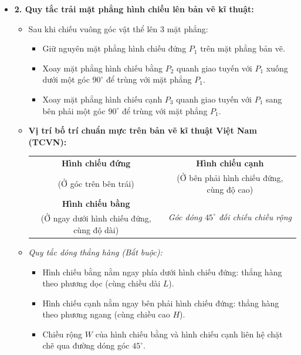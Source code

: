 \documentclass[12pt, a4paper]{article}
\begin{document}
\begin{itemize}[leftmargin=1.2cm]
\begin{itemize}[leftmargin=0.6cm]
        \item \textbf{2. Quy tắc trải mặt phẳng hình chiếu lên bản vẽ kĩ thuật:}
        \begin{itemize}
            \item Sau khi chiếu vuông góc vật thể lên 3 mặt phẳng:
            \begin{itemize}
                \item Giữ nguyên mặt phẳng hình chiếu đứng $P_1$ trên mặt phẳng bản vẽ.
                \item Xoay mặt phẳng hình chiếu bằng $P_2$ quanh giao tuyến với $P_1$ xuống dưới một góc $90^\circ$ để trùng với mặt phẳng $P_1$.
                \item Xoay mặt phẳng hình chiếu cạnh $P_3$ quanh giao tuyến với $P_1$ sang bên phải một góc $90^\circ$ để trùng với mặt phẳng $P_1$.
            \end{itemize}
            \item \textbf{Vị trí bố trí chuẩn mực trên bản vẽ kĩ thuật Việt Nam (TCVN):}
            \begin{center}
            \begin{tabular}{|c|c|}
            \hline
            \textbf{Hình chiếu đứng} & \textbf{Hình chiếu cạnh} \\ 
            (Ở góc trên bên trái) & (Ở bên phải hình chiếu đứng, cùng độ cao) \\ \hline
            \textbf{Hình chiếu bằng} & \multirow{2}{*}{\textit{Góc dóng $45^\circ$ đối chiếu chiều rộng}} \\ 
            (Ở ngay dưới hình chiếu đứng, cùng độ dài) & \\ \hline
            \end{tabular}
            \end{center}
            \item \textit{Quy tắc dóng thẳng hàng (Bắt buộc):}
            \begin{itemize}
                \item Hình chiếu bằng nằm ngay phía dưới hình chiếu đứng: thẳng hàng theo phương dọc (cùng chiều dài $L$).
                \item Hình chiếu cạnh nằm ngay bên phải hình chiếu đứng: thẳng hàng theo phương ngang (cùng chiều cao $H$).
                \item Chiều rộng $W$ của hình chiếu bằng và hình chiếu cạnh liên hệ chặt chẽ qua đường dóng góc $45^\circ$.
            \end{itemize}
        \end{itemize}


\end{itemize}
\end{itemize}
\end{document}

